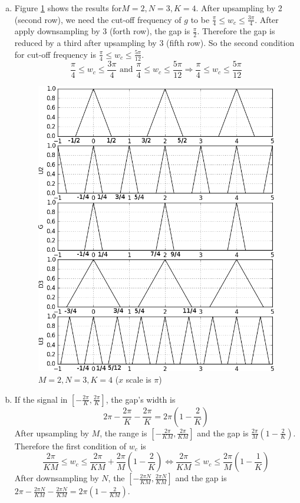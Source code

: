 \begin{enumerate}[(a)]
\item Figure \ref{fig:p2-2} shows the results for$M=2, N=3, K=4$. After upsampling by 2 (second row), we need the cut-off frequency of $g$ to be $\frac{\pi}{4} \leq w_c \leq \frac{3\pi}{4}$. After apply downsampling by 3 (forth row), the gap is $\frac{\pi}{2}$. Therefore the gap is reduced by a third after upsampling by 3 (fifth row). So the second condition for cut-off frequency is $\frac{\pi}{4} \leq w_c \leq \frac{5\pi}{12}$. 
\[\frac{\pi}{4} \leq w_c \leq \frac{3\pi}{4} \text{ and } \frac{\pi}{4} \leq w_c \leq \frac{5\pi}{12} \Rightarrow \frac{\pi}{4} \leq w_c \leq \frac{5\pi}{12}\]
\begin{figure}
	\centering
	\includegraphics[width=\textwidth]{images/p2-2}
	\caption{$M=2, N=3, K=4$ ($x$ scale is $\pi$)}
	\label{fig:p2-2}
\end{figure}

\item If the signal in $[-\frac{2\pi}{K},\frac{2\pi}{K}]$, the gap's width is 
\[2\pi - \frac{2\pi}{K} -\frac{2\pi}{K} = 2\pi(1-\frac{2}{K})\]
After upsampling by $M$, the range is $[-\frac{2\pi}{KM},\frac{2\pi}{KM}]$ and the gap is $\frac{2\pi}{M} (1-\frac{2}{K})$. Therefore the first condition of $w_c$ is 
\[\frac{2\pi}{KM} \leq w_c \leq \frac{2\pi}{KM} + \frac{2\pi}{M} (1-\frac{2}{K}) \Leftrightarrow \frac{2\pi}{KM} \leq w_c \leq \frac{2\pi}{M} (1-\frac{1}{K})\]
After downsampling by $N$, the $[-\frac{2\pi N}{KM},\frac{2\pi N}{KM}]$ and the gap is $2\pi - \frac{2\pi N}{KM} - \frac{2\pi N}{KM} = 2\pi(1-\frac{2}{KM})$.


\end{enumerate}
